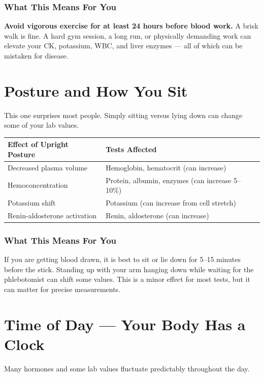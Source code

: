 \subsubsection{What This Means For You}

\textbf{Avoid vigorous exercise for at least 24 hours before blood work.} A brisk walk is fine. A hard gym session, a long run, or physically demanding work can elevate your CK, potassium, WBC, and liver enzymes --- all of which can be mistaken for disease.

\clearpage
\section{Posture and How You Sit}

This one surprises most people. Simply sitting versus lying down can change some of your lab values.

\begin{longtable}{@{}ll@{}}
\toprule
\textbf{Effect of Upright Posture} & \textbf{Tests Affected} \\
\midrule
Decreased plasma volume & Hemoglobin, hematocrit (can increase) \\
Hemoconcentration & Protein, albumin, enzymes (can increase 5--10\%) \\
Potassium shift & Potassium (can increase from cell stretch) \\
Renin-aldosterone activation & Renin, aldosterone (can increase) \\
\bottomrule
\end{longtable}

\subsubsection{What This Means For You}

If you are getting blood drawn, it is best to sit or lie down for 5--15 minutes before the stick. Standing up with your arm hanging down while waiting for the phlebotomist can shift some values. This is a minor effect for most tests, but it can matter for precise measurements.

\clearpage
\section{Time of Day --- Your Body Has a Clock}

Many hormones and some lab values fluctuate predictably throughout the day.

